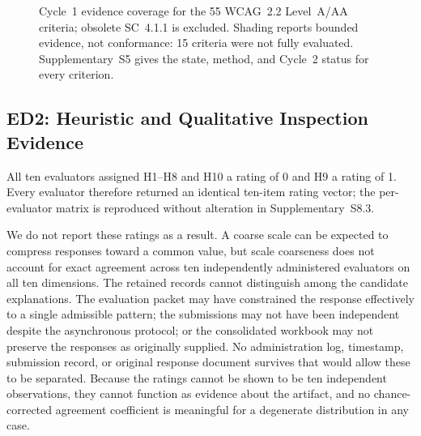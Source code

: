 \documentclass[journal]{IEEEtran}
\begin{document}
\begin{figure}[!t]
\caption{Cycle~1 evidence coverage for the 55 WCAG~2.2 Level~A/AA criteria; obsolete SC~4.1.1 is excluded. Shading reports bounded evidence, not conformance: 15 criteria were not fully evaluated. Supplementary~S5 gives the state, method, and Cycle~2 status for every criterion.}
\label{fig:wcag-coverage}
\end{figure}

\subsection{ED2: Heuristic and Qualitative Inspection Evidence}
\label{subsec:heuristic-evaluation}

All ten evaluators assigned H1--H8 and H10 a rating of 0 and H9 a rating of 1. Every evaluator therefore returned an identical ten-item rating vector; the per-evaluator matrix is reproduced without alteration in Supplementary~S8.3.

We do not report these ratings as a result. A coarse scale can be expected to compress responses toward a common value, but scale coarseness does not account for exact agreement across ten independently administered evaluators on all ten dimensions. The retained records cannot distinguish among the candidate explanations. The evaluation packet may have constrained the response effectively to a single admissible pattern; the submissions may not have been independent despite the asynchronous protocol; or the consolidated workbook may not preserve the responses as originally supplied. No administration log, timestamp, submission record, or original response document survives that would allow these to be separated. Because the ratings cannot be shown to be ten independent observations, they cannot function as evidence about the artifact, and no chance-corrected agreement coefficient is meaningful for a degenerate distribution in any case.
\end{document}
